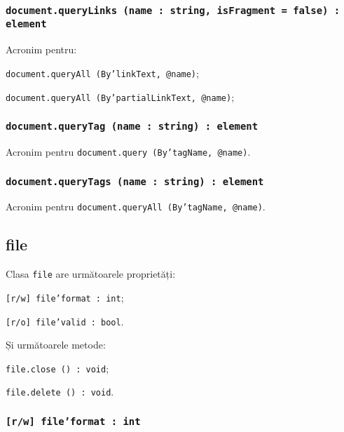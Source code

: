 \subsubsection{\texttt{document.queryLinks (name : string, isFragment = false) : element}}

Acronim pentru:
\begin{icItems}
	\item \texttt{document.queryAll (By'linkText, @name)};
	\item \texttt{document.queryAll (By'partialLinkText, @name)};
\end{icItems}

\subsubsection{\texttt{document.queryTag (name : string) : element}}

Acronim pentru \texttt{document.query (By'tagName, @name)}.

\subsubsection{\texttt{document.queryTags (name : string) : element}}

Acronim pentru \texttt{document.queryAll (By'tagName, @name)}.


\subsection{file}

Clasa \texttt{file} are următoarele proprietăți:
\begin{icItems}
	\item \texttt{[r/w] file'format : int};
	\item \texttt{[r/o] file'valid : bool}.
\end{icItems}

Și următoarele metode:
\begin{icItems}
	\item \texttt{file.close () : void};
	\item \texttt{file.delete () : void}.
\end{icItems}

\subsubsection{\texttt{[r/w] file'format : int}}

